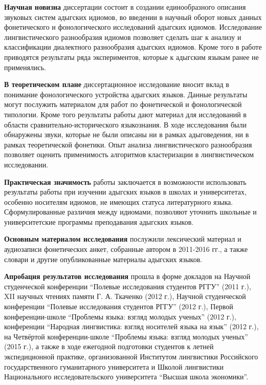 \documentclass[russian,]{book}
\begin{document}
\textbf{Научная новизна} диссертации состоит в создании единообразного
описания звуковых систем адыгских идиомов, во введении в научный оборот
новых данных фонетического и фонологического исследований адыгских
идиомов. Исследование лингвистического разнообразия идиомов позволяет
сделать шаг к анализу и классификации диалектного разнообразия адыгских
идиомов. Кроме того в работе приводятся результаты ряда экспериментов,
которые к адыгским языкам ранее не применялись.

\textbf{В теоретическом плане} диссертационное исследование вносит вклад
в понимание фонологического устройства адыгских языков. Данные
результаты могут послужить материалом для работ по фонетической и
фонологической типологии. Кроме того результаты работы дают материал для
исследований в области сравнительно-исторического языкознания. В ходе
исследования были обнаружены звуки, которые не были описаны ни в рамках
адыговедения, ни в рамках теоретической фонетики. Опыт анализа
лингвистического разнообразия позволяет оценить применимость алгоритмов
кластеризации в лингвистическом исследовании.

\textbf{Практическая значимость} работы заключается в возможности
использовать результаты работы при изучении адыгских языков в школах и
университетах, особенно носителям идиомов, не имеющих статуса
литературного языка. Сформулированные различия между идиомами, позволяют
уточнить школьные и университетские программы преподавания адыгских
языков.

\textbf{Основным материалом исследования} послужили лексический материал
и аудиозаписи фонетических анкет, собранные автором в 2011-2016 гг., а
также словари и другие опубликованные материалы адыгских языков.

\textbf{Апробация результатов исследования} прошла в форме докладов на
Научной студенческой конференции ``Полевые исследования студентов РГГУ''
(2011 г.), XII научных чтениях памяти Г. А. Ткаченко (2012 г.), Научной
студенческой конференции ``Полевые исследования студентов РГГУ'' (2012
г.), Первой конференции-школе ``Проблемы языка: взгляд молодых ученых''
(2012 г.), конференции ``Народная лингвистика: взгляд носителей языка на
язык'' (2012 г.), на Четвёртой конференции-школе ``Проблемы языка:
взгляд молодых ученых'' (2015 г.), а также в ходе ежегодной подготовки
студентов к летней экспедиционной практике, организованной Институтом
лингвистики Российского государственного гуманитарного университета и
Школой лингвистики Национального исследовательского университета
``Высшая школа экономики''.
\end{document}
